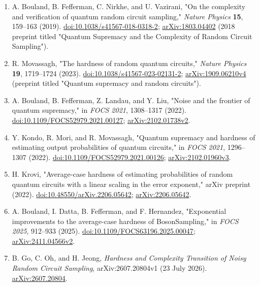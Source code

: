\begin{enumerate}[label={},leftmargin=4.8em,labelsep=0.5em]
  \footnotesize
  \item[\textup{[BFNV19]}]\label{ref:rcs-bfnv}
  A. Bouland, B. Fefferman, C. Nirkhe, and U. Vazirani,
"On the complexity and verification of quantum random circuit sampling,"
\emph{Nature Physics} \textbf{15}, 159--163 (2019).
\href{https://doi.org/10.1038/s41567-018-0318-2}{doi:10.1038/s41567-018-0318-2};
\href{https://arxiv.org/abs/1803.04402}{arXiv:1803.04402} (2018 preprint titled
"Quantum Supremacy and the Complexity of Random Circuit Sampling").

  \item[\textup{[Mov23]}]\label{ref:rcs-movassagh}
  R. Movassagh, "The hardness of random quantum circuits,"
\emph{Nature Physics} \textbf{19}, 1719--1724 (2023).
\href{https://doi.org/10.1038/s41567-023-02131-2}{doi:10.1038/s41567-023-02131-2};
\href{https://arxiv.org/abs/1909.06210v4}{arXiv:1909.06210v4}
(preprint titled "Quantum supremacy and random circuits").

  \item[\textup{[BFLL22]}]\label{ref:rcs-bfll}
  A. Bouland, B. Fefferman, Z. Landau, and Y. Liu,
"Noise and the frontier of quantum supremacy,"
in \emph{FOCS 2021}, 1308--1317 (2022).
\href{https://doi.org/10.1109/FOCS52979.2021.00127}{doi:10.1109/FOCS52979.2021.00127};
\href{https://arxiv.org/abs/2102.01738v2}{arXiv:2102.01738v2}.

  \item[\textup{[KMM22]}]\label{ref:rcs-kmm}
  Y. Kondo, R. Mori, and R. Movassagh,
"Quantum supremacy and hardness of estimating output probabilities of quantum circuits,"
in \emph{FOCS 2021}, 1296--1307 (2022).
\href{https://doi.org/10.1109/FOCS52979.2021.00126}{doi:10.1109/FOCS52979.2021.00126};
\href{https://arxiv.org/abs/2102.01960v3}{arXiv:2102.01960v3}.

  \item[\textup{[Kro22]}]\label{ref:rcs-krovi}
  H. Krovi, "Average-case hardness of estimating probabilities of random
quantum circuits with a linear scaling in the error exponent,"
arXiv preprint (2022).
\href{https://doi.org/10.48550/arXiv.2206.05642}{doi:10.48550/arXiv.2206.05642};
\href{https://arxiv.org/abs/2206.05642}{arXiv:2206.05642}.

  \item[\textup{[BDFH25]}]\label{ref:rcs-bdfh}
  A. Bouland, I. Datta, B. Fefferman, and F. Hernandez,
"Exponential improvements to the average-case hardness of BosonSampling,"
in \emph{FOCS 2025}, 912--933 (2025).
\href{https://doi.org/10.1109/FOCS63196.2025.00047}{doi:10.1109/FOCS63196.2025.00047};
\href{https://arxiv.org/abs/2411.04566v2}{arXiv:2411.04566v2}.

  \item[\textup{[GOJ26]}]\label{ref:rcs-goj}
  B. Go, C. Oh, and H. Jeong, \emph{Hardness and Complexity Transition of Noisy Random Circuit Sampling}, arXiv:2607.20804v1 (23 July 2026). \href{https://arxiv.org/abs/2607.20804}{arXiv:2607.20804}.
\end{enumerate}

